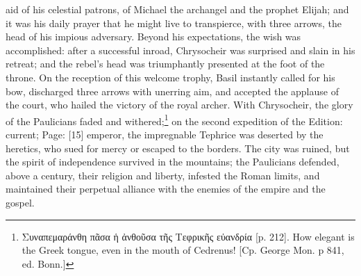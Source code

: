 aid of his celestial patrons, of Michael the archangel and the prophet Elijah; and it was his daily prayer that he might live to transpierce, with three arrows, the head of his impious adversary. Beyond his expectations, the wish was accomplished: after a successful inroad, Chrysocheir was surprised and slain in his retreat; and the rebel\texthebrew{}’s head was triumphantly presented at the foot of the throne. On the reception of this welcome trophy, Basil instantly called for his bow, discharged three arrows with unerring aim, and accepted the applause of the court, who hailed the victory of the royal archer. With Chrysocheir, the glory of the Paulicians faded and withered;\footnote{\textgreek{Συναπεμαράνθη π\texthebrew{ᾶ}σα \texthebrew{ἡ ἀ}νθο\texthebrew{ῦ}σα τ\texthebrew{ῆ}ς Τεφρικ\texthebrew{ῆ}ς ε\texthebrew{ὐ}ανδρία} [p. 212]. How elegant is the Greek tongue, even in the mouth of Cedrenus! [Cp. George Mon. p 841, ed. Bonn.]} on the second expedition of the Edition: current; Page: [15] emperor, the impregnable Tephrice was deserted by the heretics, who sued for mercy or escaped to the borders. The city was ruined, but the spirit of independence survived in the mountains; the Paulicians defended, above a century, their religion and liberty, infested the Roman limits, and maintained their perpetual alliance with the enemies of the empire and the gospel.

